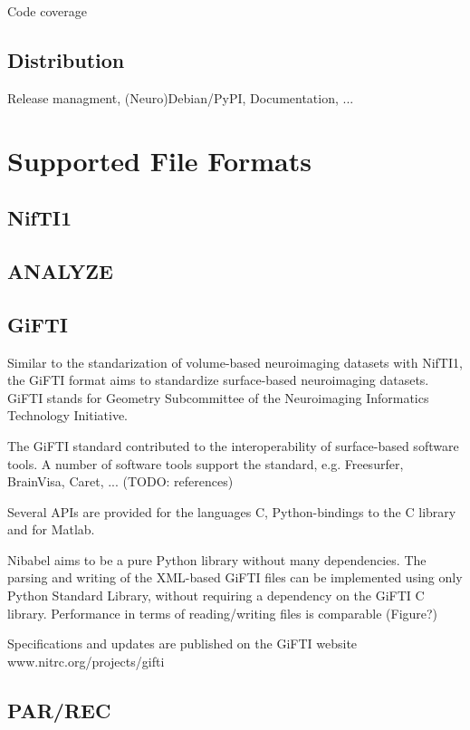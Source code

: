 \documentclass[10pt]{bmc_article}
\newenvironment{bmcformat}{\baselineskip20pt\sloppy\setboolean{publ}{false}}{\baselineskip20pt\sloppy}
\begin{document}
\begin{bmcformat}
Code coverage

\subsection{Distribution}

Release managment, (Neuro)Debian/PyPI, Documentation, ...

\section{Supported File Formats}

\subsection{NifTI1}

\subsection{ANALYZE}

\subsection{GiFTI}

Similar to the standarization of volume-based neuroimaging datasets with NifTI1,
the GiFTI format aims to standardize surface-based neuroimaging datasets.
GiFTI stands for Geometry Subcommittee of the Neuroimaging Informatics Technology
Initiative.

The GiFTI standard contributed to the interoperability of surface-based software tools.
A number of software tools support the standard, e.g. Freesurfer, BrainVisa, Caret, ...
(TODO: references)

Several APIs are provided for the languages C, Python-bindings to the C library and for Matlab.

Nibabel aims to be a pure Python library without many dependencies. The parsing and
writing of the XML-based GiFTI files can be implemented using only Python Standard Library,
without requiring a dependency on the GiFTI C library. Performance in terms of reading/writing
files is comparable (Figure?)

Specifications and updates are published on the GiFTI website www.nitrc.org/projects/gifti

\subsection{PAR/REC}


\end{bmcformat}
\end{document}
